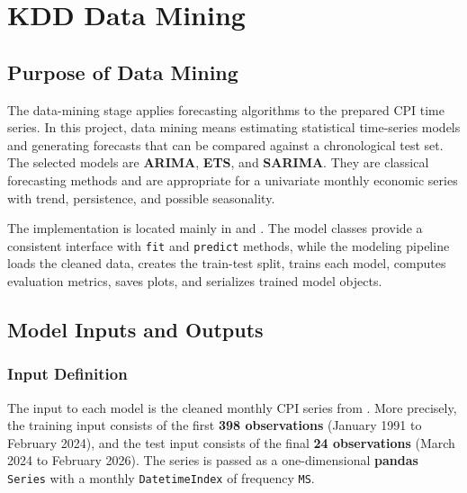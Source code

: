 %
%
%

\chapter{KDD Data Mining}
\label{ch:kdd-data-mining}

\section{Purpose of Data Mining}

The data-mining stage applies forecasting algorithms to the prepared CPI time series. In this project, data mining means estimating statistical time-series models and generating forecasts that can be compared against a chronological test set. The selected models are \textbf{ARIMA}, \textbf{ETS}, and \textbf{SARIMA}. They are classical forecasting methods and are appropriate for a univariate monthly economic series with trend, persistence, and possible seasonality.

The implementation is located mainly in  and . The model classes provide a consistent interface with \texttt{fit} and \texttt{predict} methods, while the modeling pipeline loads the cleaned data, creates the train-test split, trains each model, computes evaluation metrics, saves plots, and serializes trained model objects.

\section{Model Inputs and Outputs}

\subsection{Input Definition}

The input to each model is the cleaned monthly CPI series from . More precisely, the training input consists of the first \textbf{398 observations} (January 1991 to February 2024), and the test input consists of the final \textbf{24 observations} (March 2024 to February 2026). The series is passed as a one-dimensional \textbf{pandas} \texttt{Series} with a monthly \texttt{DatetimeIndex} of frequency \texttt{MS}.

